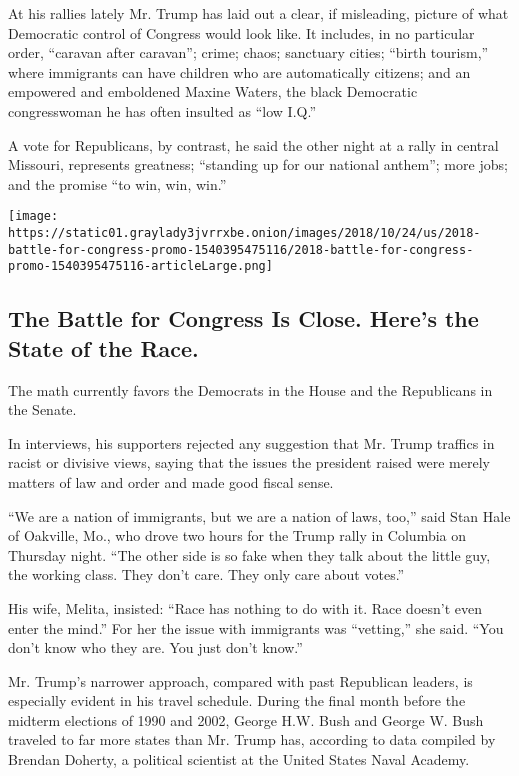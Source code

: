 At his rallies lately Mr. Trump has laid out a clear, if misleading,
picture of what Democratic control of Congress would look like. It
includes, in no particular order, ``caravan after caravan''; crime;
chaos; sanctuary cities; ``birth tourism,'' where immigrants can have
children who are automatically citizens; and an empowered and emboldened
Maxine Waters, the black Democratic congresswoman he has often insulted
as ``low I.Q.''

A vote for Republicans, by contrast, he said the other night at a rally
in central Missouri, represents greatness; ``standing up for our
national anthem''; more jobs; and the promise ``to win, win, win.''

\href{https://www.nytimes3xbfgragh.onion/interactive/2018/10/24/us/elections/2018-battle-for-congress.html}{}

\texttt{[image: https://static01.graylady3jvrrxbe.onion/images/2018/10/24/us/2018-battle-for-congress-promo-1540395475116/2018-battle-for-congress-promo-1540395475116-articleLarge.png]}

\hypertarget{the-battle-for-congress-is-close-heres-the-state-of-the-race}{%
\subsection{The Battle for Congress Is Close. Here's the State of the
Race.}\label{the-battle-for-congress-is-close-heres-the-state-of-the-race}}

The math currently favors the Democrats in the House and the Republicans
in the Senate.

In interviews, his supporters rejected any suggestion that Mr. Trump
traffics in racist or divisive views, saying that the issues the
president raised were merely matters of law and order and made good
fiscal sense.

``We are a nation of immigrants, but we are a nation of laws, too,''
said Stan Hale of Oakville, Mo., who drove two hours for the Trump rally
in Columbia on Thursday night. ``The other side is so fake when they
talk about the little guy, the working class. They don't care. They only
care about votes.''

His wife, Melita, insisted: ``Race has nothing to do with it. Race
doesn't even enter the mind.'' For her the issue with immigrants was
``vetting,'' she said. ``You don't know who they are. You just don't
know.''

Mr. Trump's narrower approach, compared with past Republican leaders, is
especially evident in his travel schedule. During the final month before
the midterm elections of 1990 and 2002, George H.W. Bush and George W.
Bush traveled to far more states than Mr. Trump has, according to data
compiled by Brendan Doherty, a political scientist at the United States
Naval Academy.

